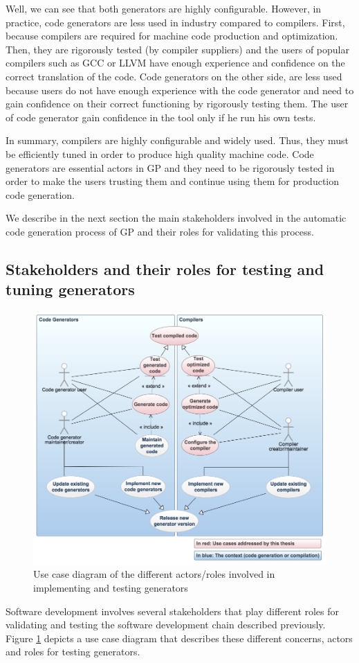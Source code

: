 Well, we can see that both generators are highly configurable. However, in practice, code generators are less used in industry compared to compilers. First, because compilers are required for machine code production and optimization. Then, they are rigorously tested (by compiler suppliers) and the users of popular compilers such as GCC or LLVM have enough experience and confidence on the correct translation of the code. 
Code generators on the other side, are less used because users do not have enough experience with the code generator and need to gain confidence on their correct functioning by rigorously testing them. The user of code generator gain confidence in the tool only if he run his own tests.

In summary, compilers are highly configurable and widely used. Thus, they must be efficiently tuned in order to produce high quality machine code. Code generators are essential actors in GP and they need to be rigorously tested in order to make the users trusting them and continue using them for production code generation.

We describe in the next section the main stakeholders involved in the automatic code generation process of GP and their roles for validating this process.


\subsection{Stakeholders and their roles for testing and tuning generators}
\begin{figure}[h]
	\center
	\includegraphics[scale=0.45]{Background/fig/usecase}
	\caption{Use case diagram of the different actors/roles involved in implementing and testing generators}
	\label{fig:usecase}
\end{figure}
Software development involves several stakeholders that play different roles for validating and testing the software development chain described previously.
Figure \ref{fig:usecase} depicts a use case diagram that describes these different concerns, actors and roles for testing generators.

